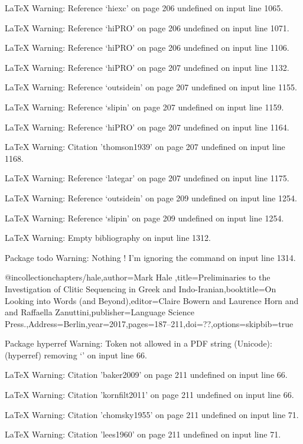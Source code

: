 LaTeX Warning: Reference `hiexc' on page 206 undefined on input line 1065.


LaTeX Warning: Reference `hiPRO' on page 206 undefined on input line 1071.


LaTeX Warning: Reference `hiPRO' on page 206 undefined on input line 1106.


LaTeX Warning: Reference `hiPRO' on page 207 undefined on input line 1132.


LaTeX Warning: Reference `outsidein' on page 207 undefined on input line 1155.


LaTeX Warning: Reference `slipin' on page 207 undefined on input line 1159.


LaTeX Warning: Reference `hiPRO' on page 207 undefined on input line 1164.


LaTeX Warning: Citation 'thomson1939' on page 207 undefined on input line 1168.


LaTeX Warning: Reference `lategar' on page 207 undefined on input line 1175.


LaTeX Warning: Reference `outsidein' on page 209 undefined on input line 1254.


LaTeX Warning: Reference `slipin' on page 209 undefined on input line 1254.


LaTeX Warning: Empty bibliography on input line 1312.


Package todo Warning: Nothing \todo! I'm ignoring the \todos command on input line 1314.

@incollection{chapters/hale,author={Mark Hale },title={{Preliminaries to the Investigation of Clitic Sequencing in Greek and Indo-Iranian}},booktitle={{On Looking into Words (and Beyond)}},editor={Claire Bowern and  Laurence Horn and  and Raffaella Zanuttini},publisher={Language Science Press.},Address={Berlin},year=2017,pages={187--211},doi={??},options={skipbib=true}}

Package hyperref Warning: Token not allowed in a PDF string (Unicode):
(hyperref)                removing `\newline' on input line 66.


LaTeX Warning: Citation 'baker2009' on page 211 undefined on input line 66.


LaTeX Warning: Citation 'kornfilt2011' on page 211 undefined on input line 66.


LaTeX Warning: Citation 'chomsky1955' on page 211 undefined on input line 71.


LaTeX Warning: Citation 'lees1960' on page 211 undefined on input line 71.


